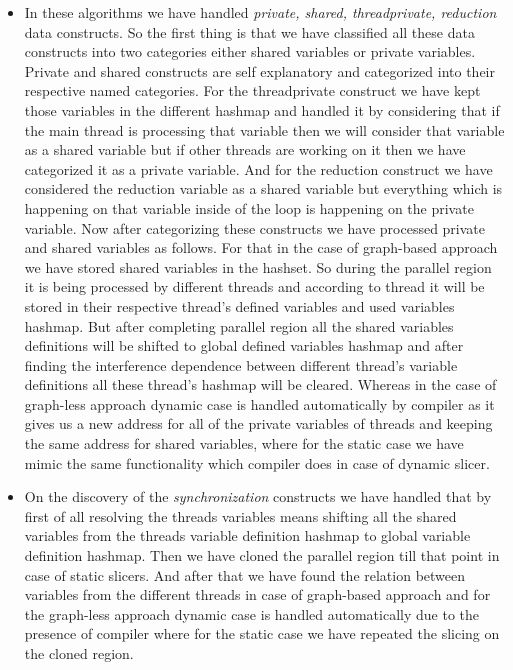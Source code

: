 \documentclass[conference]{IEEEtran}
\begin{document}
\begin{itemize}
\item In these algorithms we have handled \emph{private, shared, threadprivate, reduction} data constructs. So the first thing is that we have classified all these data constructs into two categories either shared variables or private variables. Private and shared constructs are self explanatory and categorized into their respective named categories. For the threadprivate construct we have kept those variables in the different hashmap and handled it by considering that if the main thread is processing that variable then we will consider that variable as a shared variable but if other threads are working on it then we have categorized it as a private variable. And for the reduction construct we have considered the reduction variable as a shared variable but everything which is happening on that variable inside of the loop is happening on the private variable. Now after categorizing these constructs we have processed private and shared variables as follows. For that in the case of graph-based approach we have stored shared variables in the hashset. So during the parallel region it is being processed by different threads and according to thread it will be stored in their respective thread’s defined variables and used variables hashmap. But after completing parallel region all the shared variables definitions will be shifted to global defined variables hashmap and after finding the interference dependence between different thread’s variable definitions all these thread's hashmap will be cleared. Whereas in the case of graph-less approach dynamic case is handled automatically by compiler as it gives us a new address for all of the private variables of threads and keeping the same address for shared variables, where for the static case we have mimic the same functionality which compiler does in case of dynamic slicer.
\item On the discovery of the \emph{synchronization} constructs we have handled that by first of all resolving the threads variables means shifting all the shared variables from the threads variable definition hashmap to global variable definition hashmap. Then we have cloned the parallel region till that point in case of static slicers. And after that we have found the relation between variables from the different threads in case of graph-based approach and for the graph-less approach dynamic case is handled automatically due to the presence of compiler where for the static case we have repeated the slicing on the cloned region. 
\end{itemize}
\end{document}
